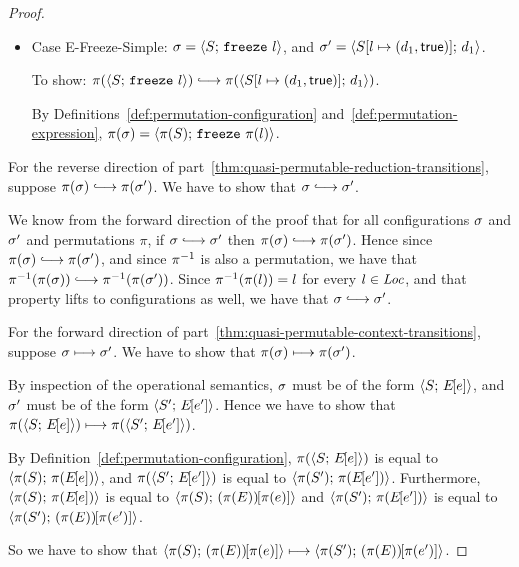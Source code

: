 \begin{proof}
\begin{itemize}
    \item Case {\sc E-Freeze-Simple}: $\sigma =
      \langle S;\, \mbox{\texttt{freeze}}~l \rangle$, and $\sigma' =
      \langle S[l \mapsto (d_1, \textsf{true})];\, d_1 \rangle$.

      To show: $\pi(\config{S}{\freeze{l}}) \parstepsto
      \pi(\config{\extS{S}{l}{d_1}{\frozentrue}}{d_1})$.

      By Definitions~\ref{def:permutation-configuration}
      and~\ref{def:permutation-expression}, $\pi(\sigma) =
      \langle \pi(S);\, \mbox{\texttt{freeze}}~\pi(l) \rangle$.

  \end{itemize}

  For the reverse direction of
  part~\ref{thm:quasi-permutable-reduction-transitions}, suppose
  $\pi(\conf) \parstepsto \pi(\conf')$.  We have to show that $\conf
  \parstepsto \conf'$.

  We know from the forward direction of the proof that for all
  configurations $\sigma$ and $\sigma'$ and permutations $\pi$, if
  $\conf \parstepsto \conf'$ then $\pi(\conf) \parstepsto
  \pi(\conf')$.  Hence since $\pi(\conf) \parstepsto \pi(\conf')$, and
  since $\pi^{-1}$ is also a permutation, we have that
  $\piinv(\pi(\conf)) \parstepsto \piinv(\pi(\conf'))$.  Since
  $\pi^{-1}(\pi(l)) = l$ for every $l \in \mathit{Loc}$, and that property lifts
  to configurations as well, we have that $\conf \parstepsto \conf'$.


  For the forward direction of
  part~\ref{thm:quasi-permutable-context-transitions}, suppose $\sigma
  \longmapsto \sigma'$.  We have to show that $\pi(\sigma) \longmapsto
  \pi(\sigma')$.

  By inspection of the operational semantics, $\sigma$ must be of the
  form $\langle S;\, E\hspace{-1mm}\left[e\right] \rangle$, and $\sigma'$ must be of the form
  $\langle S';\, E\hspace{-1mm}\left[e'\right] \rangle$.  Hence we have to show that
  $\pi(\langle S;\, E\hspace{-1mm}\left[e\right] \rangle) \longmapsto \pi(\langle S';\, E\hspace{-1mm}\left[e'\right] \rangle)$.

  By Definition~\ref{def:permutation-configuration},
  $\pi(\langle S;\, E\hspace{-1mm}\left[e\right] \rangle)$ is equal to $\langle \pi(S);\, \pi(E\hspace{-1mm}\left[e\right]) \rangle$,
  and $\pi(\langle S';\, E\hspace{-1mm}\left[e'\right] \rangle)$ is equal to
  $\langle \pi(S');\, \pi(E\hspace{-1mm}\left[e'\right]) \rangle$.  Furthermore,
  $\langle \pi(S);\, \pi(E\hspace{-1mm}\left[e\right]) \rangle$ is equal to
  $\langle \pi(S);\, (\pi(E))\hspace{-1mm}\left[\pi(e)\right] \rangle$ and
  $\langle \pi(S');\, \pi(E\hspace{-1mm}\left[e'\right]) \rangle$ is equal to
  $\langle \pi(S');\, (\pi(E))\hspace{-1mm}\left[\pi(e')\right] \rangle$.

  So we have to show that
  $\langle \pi(S);\, (\pi(E))\hspace{-1mm}\left[\pi(e)\right] \rangle \longmapsto
  \langle \pi(S');\, (\pi(E))\hspace{-1mm}\left[\pi(e')\right] \rangle$.


\end{proof}
